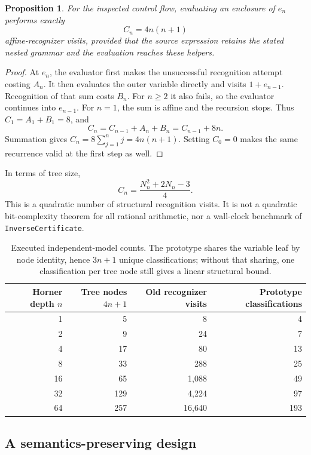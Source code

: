 \documentclass[11pt,letterpaper]{article}
\newcommand{\prop}[1]{\texttt{#1}}
\newtheorem{proposition}{Proposition}
\begin{document}
\begin{proposition}
For the inspected control flow, evaluating an enclosure of $e_n$ performs exactly
\[
 C_n=4n(n+1)
\]
affine-recognizer visits, provided that the source expression retains the stated
nested grammar and the evaluation reaches these helpers.
\end{proposition}
\begin{proof}
At $e_n$, the evaluator first makes the unsuccessful recognition attempt costing
$A_n$. It then evaluates the outer variable directly and visits $1+e_{n-1}$.
Recognition of that sum costs $B_n$. For $n\ge2$ it also fails, so the evaluator
continues into $e_{n-1}$. For $n=1$, the sum is affine and the recursion stops.
Thus $C_1=A_1+B_1=8$, and
\[
 C_n=C_{n-1}+A_n+B_n=C_{n-1}+8n.
\]
Summation gives $C_n=8\sum_{j=1}^n j=4n(n+1)$. Setting $C_0=0$ makes the same
recurrence valid at the first step as well.
\end{proof}

In terms of tree size,
\[
 C_n=\frac{N_n^2+2N_n-3}{4}.
\]
This is a quadratic number of structural recognition visits. It is not a
quadratic bit-complexity theorem for all rational arithmetic, nor a wall-clock
benchmark of \prop{InverseCertificate}.

\begin{table}[htbp]
\centering\small
\begin{tabular}{rrrr}
\toprule
Horner depth $n$ & Tree nodes $4n+1$ & Old recognizer visits & Prototype classifications \\
\midrule
1 & 5 & 8 & 4 \\
2 & 9 & 24 & 7 \\
4 & 17 & 80 & 13 \\
8 & 33 & 288 & 25 \\
16 & 65 & 1,088 & 49 \\
32 & 129 & 4,224 & 97 \\
64 & 257 & 16,640 & 193 \\
\bottomrule
\end{tabular}
\caption{Executed independent-model counts. The prototype shares the variable
leaf by node identity, hence $3n+1$ unique classifications; without that sharing,
one classification per tree node still gives a linear structural bound.}
\label{tab:counts}
\end{table}

\subsection{A semantics-preserving design}
\end{document}

